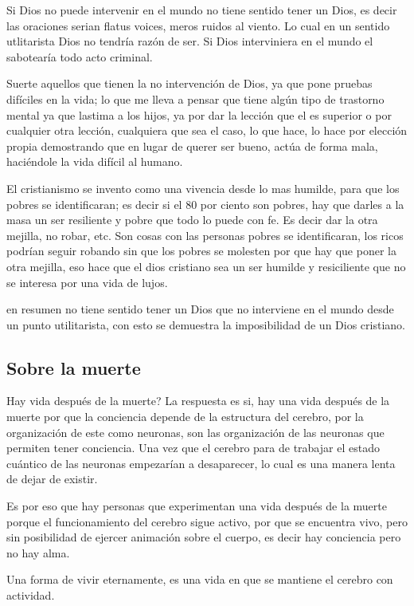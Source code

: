 \documentclass[12pt,letterpaper, a4paper ]{article}
\begin{document}
Si Dios no puede intervenir en el mundo no tiene sentido tener un Dios, es decir las oraciones serian flatus voices, meros ruidos al viento. Lo cual en un sentido utlitarista Dios no tendría razón de ser. Si Dios interviniera en el mundo el sabotearía todo acto criminal.

Suerte aquellos que tienen la no intervención de Dios, ya que pone pruebas difíciles en la vida; lo que me lleva a pensar que tiene algún tipo de trastorno mental ya que lastima a los hijos, ya por dar la lección que el es superior o por cualquier otra lección, cualquiera que sea el caso, lo que hace, lo hace por elección propia demostrando que en lugar de querer ser bueno, actúa de forma mala, haciéndole la vida difícil al humano.


El cristianismo se invento como una vivencia desde lo mas humilde, para que los pobres se identificaran; es decir si el 80 por ciento son pobres, hay que darles a la masa un ser resiliente y pobre que todo lo puede con fe. Es decir dar la otra mejilla, no robar, etc. Son cosas con las personas pobres se identificaran, los ricos podrían seguir robando sin que los pobres se molesten por que hay que poner la otra mejilla, eso hace que el dios cristiano sea un ser humilde y resiciliente que no se interesa por una vida de lujos.

en resumen no tiene sentido tener un Dios que no interviene en el mundo desde un punto utilitarista, con esto se demuestra la imposibilidad de un Dios cristiano.



\subsection{Sobre la muerte}

Hay vida después de la muerte? La respuesta es si, hay una vida después de la muerte por que la conciencia depende de la estructura del cerebro, por la organización de este como neuronas, son las organización de las neuronas que permiten tener conciencia. Una vez que el cerebro para de trabajar el estado cuántico de las neuronas empezarían a desaparecer, lo cual es una manera lenta de dejar de existir.

Es por eso que hay personas que experimentan una vida después de la muerte porque el funcionamiento del cerebro sigue activo, por que se encuentra vivo, pero sin posibilidad de ejercer animación sobre el cuerpo, es decir hay conciencia pero no hay alma.

Una forma de vivir eternamente, es una vida en que se mantiene el cerebro con actividad.
\end{document}
